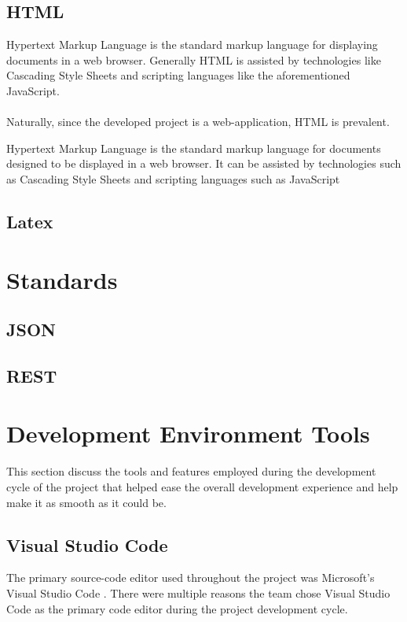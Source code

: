 \subsection{HTML}
Hypertext Markup Language is the standard markup language for displaying documents in a web browser. Generally HTML is assisted by technologies like Cascading Style Sheets and scripting languages like the aforementioned JavaScript.

\paragraph{}
Naturally, since the developed project is a web-application, HTML is prevalent.


Hypertext Markup Language is the standard markup language for documents designed to be displayed in a web browser. It can be assisted by technologies such as Cascading Style Sheets and scripting languages such as JavaScript

\subsection{Latex}

\section{Standards}
\subsection{JSON}
\subsection{REST}

\section{Development Environment Tools}
This section discuss the tools and features employed during the development cycle of the project that helped ease the overall development experience and help make it as smooth as it could be.

\subsection{Visual Studio Code}
The primary source-code editor used throughout the project was Microsoft's Visual Studio Code \cite{VS_CODE}. There were multiple reasons the team chose Visual Studio Code as the primary code editor during the project development cycle.

